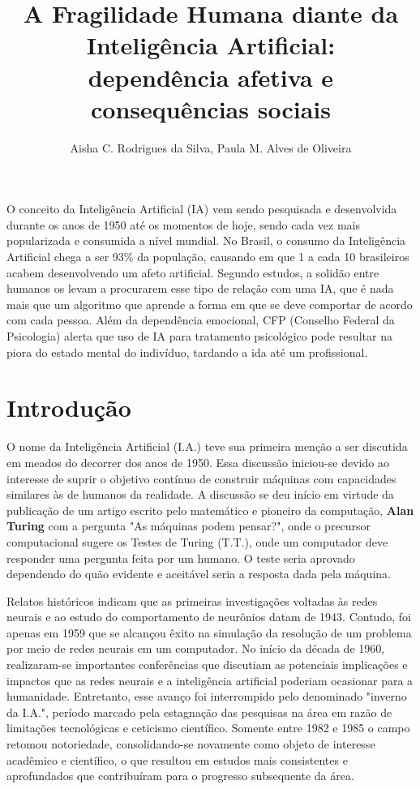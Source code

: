 \documentclass[12pt]{article}
\title{A Fragilidade Humana diante da Inteligência Artificial:\\ dependência afetiva e consequências sociais}
\author{Aisha C. Rodrigues da Silva\inst{1}, Paula M. Alves de Oliveira\inst{2} }
\begin{document}
 

\maketitle

\begin{resumo} 
  O conceito da Inteligência Artificial (IA) vem sendo pesquisada e desenvolvida durante os anos de 1950 até os momentos de hoje, sendo cada vez mais popularizada e consumida a nível mundial.
  No Brasil, o consumo da Inteligência Artificial chega a ser 93\% da população, causando em que 1 a cada 10 brasileiros acabem desenvolvendo um afeto artificial. Segundo estudos, a solidão entre humanos os levam a procurarem esse tipo de relação com uma IA, que é nada mais que um algoritmo que aprende a forma em que se deve comportar de acordo com cada pessoa. Além da dependência emocional, CFP (Conselho Federal da Psicologia) alerta que uso de IA para tratamento psicológico pode resultar na piora do estado mental do indivíduo, tardando a ida até um profissional.
\end{resumo}

\section{Introdução}
\hspace{1.2cm}O nome da Inteligência Artificial (I.A.) teve sua primeira menção a ser discutida em meados do decorrer dos anos de 1950. Essa discussão iniciou-se devido ao interesse de suprir o objetivo contínuo de construir máquinas com capacidades similares às de humanos da realidade. A discussão se deu início em virtude da publicação de um artigo escrito pelo matemático e pioneiro da computação, \textbf{Alan Turing} com a pergunta "As máquinas podem pensar?", onde o precursor computacional sugere os Testes de Turing (T.T.), onde um computador deve responder uma pergunta feita por um humano. O teste seria aprovado dependendo do quão evidente e aceitável seria a resposta dada pela máquina.

Relatos históricos indicam que as primeiras investigações voltadas às redes neurais e ao estudo do comportamento de neurônios datam de 1943. Contudo, foi apenas em 1959 que se alcançou êxito na simulação da resolução de um problema por meio de redes neurais em um computador. No início da década de 1960, realizaram-se importantes conferências que discutiam as potenciais implicações e impactos que as redes neurais e a inteligência artificial poderiam ocasionar para a humanidade. Entretanto, esse avanço foi interrompido pelo denominado "inverno da I.A.", período marcado pela estagnação das pesquisas na área em razão de limitações tecnológicas e ceticismo científico. Somente entre 1982 e 1985 o campo retomou notoriedade, consolidando-se novamente como objeto de interesse acadêmico e científico, o que resultou em estudos mais consistentes e aprofundados que contribuíram para o progresso subsequente da área.
\end{document}
